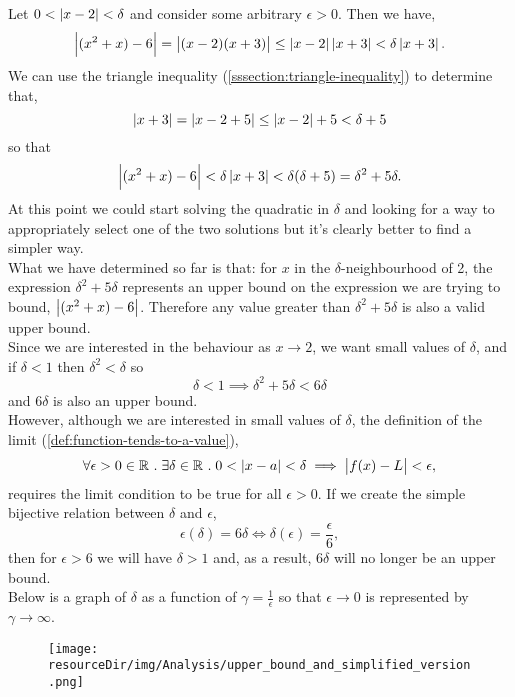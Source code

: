 \documentclass[../MathsNotesBase.tex]{subfiles}
\begin{document}
{\begin{exe}
{				Let ${ 0 < \left\lvert x - 2\right\rvert <\delta }$ and consider some arbitrary ${ \epsilon > 0 }$. Then we have,
				\[ \left\lvert(x^2 + x) - 6\right\rvert = \left\lvert(x - 2)(x + 3)\right\rvert \leq \left\lvert x - 2\right\rvert\left\lvert x + 3\right\rvert < \delta \left\lvert x + 3\right\rvert. \]
				We can use the triangle inequality (\ref{sssection:triangle-inequality}) to determine that,
				\[ \left\lvert x + 3\right\rvert = \left\lvert x - 2 + 5\right\rvert \leq \left\lvert x - 2\right\rvert + 5 < \delta + 5 \]
				so that
				\[ \left\lvert(x^2 + x) - 6\right\rvert < \delta \left\lvert x + 3\right\rvert < \delta(\delta + 5) = \delta^2 + 5\delta. \]
				At this point we could start solving the quadratic in $\delta$ and looking for a way to appropriately select one of the two solutions but it's clearly better to find a simpler way.\\
				What we have determined so far is that: for $x$ in the $\delta$-neighbourhood of 2, the expression ${ \delta^2 + 5\delta }$ represents an upper bound on the expression we are trying to bound, ${ \left\lvert(x^2 + x) - 6\right\rvert }$. Therefore any value greater than ${ \delta^2 + 5\delta }$ is also a valid upper bound.\\ Since we are interested in the behaviour as ${ x \to 2 }$, we want small values of $\delta$, and if ${ \delta < 1 }$ then ${ \delta^2 <\delta }$ so
				\[ \delta < 1 \implies \delta^2 + 5\delta < 6\delta \]
				and $6\delta$ is also an upper bound.\\
				
				However, although we are interested in small values of $\delta$, the definition of the limit (\ref{def:function-tends-to-a-value}),
				\[ \forall \epsilon > 0 \in \mathbb{R}^{} \;.\; \exists \delta \in \mathbb{R}^{} \;.\; 0 < \left\lvert x - a\right\rvert < \delta \implies \left\lvert f(x) - L\right\rvert < \epsilon, \]
				requires the limit condition to be true for all ${ \epsilon > 0 }$. If we create the simple bijective relation between $\delta$ and $\epsilon$,
				\[ \epsilon(\delta) = 6\delta \iff \delta(\epsilon) = \frac{\epsilon}{6}, \]
				then for ${ \epsilon > 6 }$ we will have ${ \delta > 1 }$ and, as a result, ${ 6\delta }$ will no longer be an upper bound.\\

				Below is a graph of $\delta$ as a function of ${ \gamma = \frac{1}{\epsilon} }$ so that ${ \epsilon \to 0 }$ is represented by ${ \gamma \to \infty }$.
				\begin{figure}[h!]
					\centering
					\texttt{[image: \\resourceDir/img/Analysis/upper\_bound\_and\_simplified\_version.png]}
				\end{figure}
				
}
\end{exe}}
\end{document}
